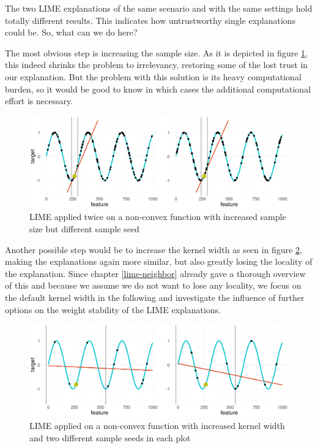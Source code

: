 \documentclass[]{krantz}
\begin{document}
The two LIME explanations of the same scenario and with the same
settings hold totally different results. This indicates how
untrustworthy single explanations could be. So, what can we do here?

The most obvious step is increasing the sample size. As it is depicted
in figure \ref{fig:figgood}, this indeed shrinks the problem to
irrelevancy, restoring some of the lost trust in our explanation. But
the problem with this solution is its heavy computational burden, so it
would be good to know in which cases the additional computational effort
is necessary.

\begin{figure}

{\centering \includegraphics[width=0.99\linewidth]{images/nonconvex_samples_size100_1vs2} 

}

\caption{LIME applied twice on a non-convex function with increased sample size but different sample seed}\label{fig:figgood}
\end{figure}

Another possible step would be to increase the kernel width as seen in
figure \ref{fig:figkernel}, making the explanations again more similar,
but also greatly losing the locality of the explanation. Since chapter
\ref{lime-neighbor} already gave a thorough overview of this and because
we assume we do not want to lose any locality, we focus on the default
kernel width in the following and investigate the influence of further
options on the weight stability of the LIME explanations.

\begin{figure}

{\centering \includegraphics[width=0.99\linewidth]{images/nonconvex_samples_width81000_1vs2} 

}

\caption{LIME applied on a non-convex function with increased kernel width and two different sample seeds in each plot}\label{fig:figkernel}
\end{figure}
\end{document}
